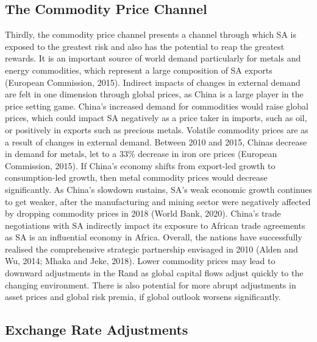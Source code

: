 \documentclass[11pt,preprint, authoryear]{elsarticle}
\numberwithin{equation}{section}
\numberwithin{figure}{section}
\numberwithin{table}{section}
\begin{document}
\hypertarget{the-commodity-price-channel}{%
\subsection{The Commodity Price
Channel}\label{the-commodity-price-channel}}

Thirdly, the commodity price channel presents a channel through which SA
is exposed to the greatest risk and also has the potential to reap the
greatest rewards. It is an important source of world demand particularly
for metals and energy commodities, which represent a large composition
of SA exports (European Commission, 2015). Indirect impacts of changes
in external demand are felt in one dimension through global prices, as
China is a large player in the price setting game. China's increased
demand for commodities would raise global prices, which could impact SA
negatively as a price taker in imports, such as oil, or positively in
exports such as precious metals. Volatile commodity prices are as a
result of changes in external demand. Between 2010 and 2015, Chinas
decrease in demand for metals, let to a 33\% decrease in iron ore prices
(European Commission, 2015). If China's economy shifts from export-led
growth to consumption-led growth, then metal commodity prices would
decrease significantly. As China's slowdown sustains, SA's weak economic
growth continues to get weaker, after the manufacturing and mining
sector were negatively affected by dropping commodity prices in 2018
(World Bank, 2020). China's trade negotiations with SA indirectly impact
its exposure to African trade agreements as SA is an influential economy
in Africa. Overall, the nations have successfully realised the
comprehensive strategic partnership envisaged in 2010 (Alden and Wu,
2014; Mhaka and Jeke, 2018). Lower commodity prices may lead to downward
adjustments in the Rand as global capital flows adjust quickly to the
changing environment. There is also potential for more abrupt
adjustments in asset prices and global risk premia, if global outlook
worsens significantly.

\hypertarget{exchange-rate-adjustments}{%
\subsection{Exchange Rate Adjustments}\label{exchange-rate-adjustments}}
\end{document}
